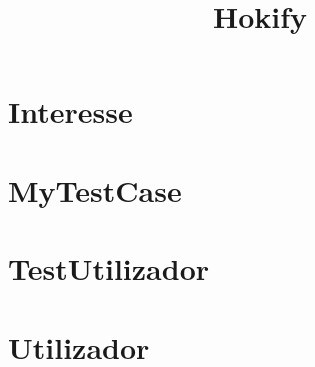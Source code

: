\documentclass{article}
\begin{document}
\title{Hokify}
\author{}
\maketitle
\tableofcontents

\section{Interesse}

\section{MyTestCase}

\section{TestUtilizador}

\section{Utilizador}

\end{document}
